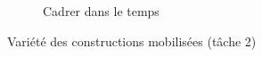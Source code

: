 \documentclass[output=paper]{langscibook}
\begin{document}
\begin{otherlanguage}{french}
\begin{figure}
\begin{subfigure}{\textwidth}
  \caption{Cadrer dans le temps}
   \end{subfigure}
\caption{Variété des constructions mobilisées (tâche 2)\label{fig:felce:4}}
\end{figure}


\end{otherlanguage}
\end{document}
